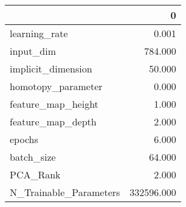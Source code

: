 \begin{tabular}{lr}
\toprule
{} &           0 \\
\midrule
learning\_rate          &       0.001 \\
input\_dim              &     784.000 \\
implicit\_dimension     &      50.000 \\
homotopy\_parameter     &       0.000 \\
feature\_map\_height     &       1.000 \\
feature\_map\_depth      &       2.000 \\
epochs                 &       6.000 \\
batch\_size             &      64.000 \\
PCA\_Rank               &       2.000 \\
N\_Trainable\_Parameters &  332596.000 \\
\bottomrule
\end{tabular}
